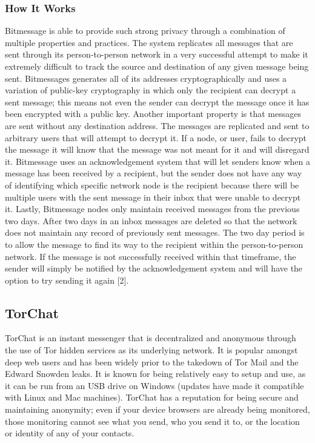 \documentclass[twocolumn,letterpaper,10pt]{article}
\begin{document}
\subsubsection{How It Works}
Bitmessage is able to provide such strong privacy through a combination of multiple properties and practices. The system replicates all messages that are sent through its person-to-person network in a very successful attempt to make it extremely difficult to track the source and destination of any given message being sent. Bitmessages generates all of its addresses cryptographically and uses a variation of public-key cryptography in which only the recipient can decrypt a sent message; this means not even the sender can decrypt the message once it has been encrypted with a public key. Another important property is that messages are sent without any destination address. The messages are replicated and sent to arbitrary users that will attempt to decrypt it. If a node, or user, fails to decrypt the message it will know that the message was not meant for it and will disregard it. Bitmessage uses an acknowledgement system that will let senders know when a message has been received by a recipient, but the sender does not have any way of identifying which specific network node is the recipient because there will be multiple users with the sent message in their inbox that were unable to decrypt it. Lastly, Bitmessage nodes only maintain received messages from the previous two days. After two days in an inbox messages are deleted so that the network does not maintain any record of previously sent messages. The two day period is to allow the message to find its way to the recipient within the person-to-person network. If the message is not successfully received within that timeframe, the sender will simply be notified by the acknowledgement system and will have the option to try sending it again [2]. 

\subsection{TorChat}

TorChat is an instant messenger that is decentralized and anonymous through the use of Tor hidden services as its underlying network. It is popular amongst deep web users and has been widely prior to the takedown of Tor Mail and the Edward Snowden leaks. It is known for being relatively easy to setup and use, as it can be run from an USB drive on Windows (updates have made it compatible with Linux and Mac machines). TorChat has a reputation for being secure and maintaining anonymity; even if your device browsers are already being monitored, those monitoring cannot see what you send, who you send it to, or the location or identity of any of your contacts.
\end{document}
